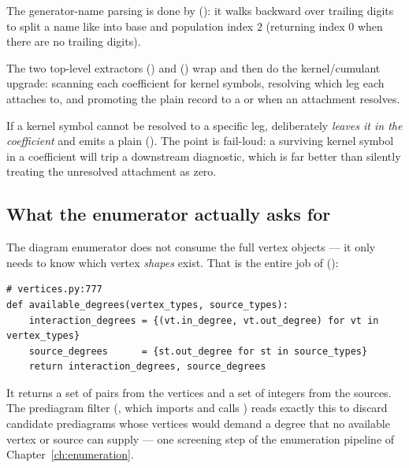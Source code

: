 The generator-name parsing is done by 
(): it walks backward over trailing digits to split a name like
 into base  and population index $2$ (returning index $0$ when
there are no trailing digits).

The two top-level extractors  ()
and  () wrap
 and then do the kernel/cumulant upgrade: scanning each
coefficient for kernel symbols, resolving which leg each attaches to, and promoting
the plain record to a  or  when an
attachment resolves.

\begin{gotcha}
If a kernel symbol cannot be resolved to a specific leg, 
deliberately \emph{leaves it in the coefficient} and emits a plain 
(). The point is fail-loud: a surviving kernel symbol in a
coefficient will trip a downstream diagnostic, which is far better than silently
treating the unresolved attachment as zero.
\end{gotcha}

\subsection{What the enumerator actually asks for}

The diagram enumerator does not consume the full vertex objects --- it only needs to
know which vertex \emph{shapes} exist. That is the entire job of
 ():

\begin{lstlisting}
# vertices.py:777
def available_degrees(vertex_types, source_types):
    interaction_degrees = {(vt.in_degree, vt.out_degree) for vt in vertex_types}
    source_degrees      = {st.out_degree for st in source_types}
    return interaction_degrees, source_degrees
\end{lstlisting}

It returns a set of  pairs from the vertices and a set
of  integers from the sources. The prediagram filter
(, which imports and calls )
reads exactly this to discard candidate prediagrams whose vertices would demand a
degree that no available vertex or source can supply --- one screening step of the
enumeration pipeline of Chapter~\ref{ch:enumeration}.

